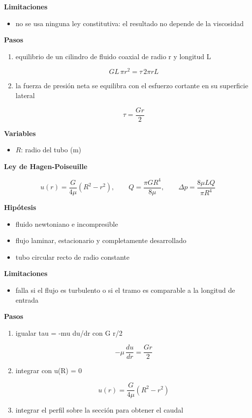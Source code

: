 \documentclass[10pt,openany]{book}
\begin{document}
\begin{tcolorbox}[title={Desarrollos del modelo}, studiumdef, breakable]
\noindent\textbf{Limitaciones}
\begin{itemize}
\item no se usa ninguna ley constitutiva: el resultado no depende de la viscosidad
\end{itemize}

\noindent\textbf{Pasos}
\begin{enumerate}
\item
equilibrio de un cilindro de fluido coaxial de radio r y longitud L

\[
G L\,\pi r^{2} = \tau\,2\pi r L
\]
\item
la fuerza de presión neta se equilibra con el esfuerzo cortante en su superficie lateral

\[
\tau = \frac{G r}{2}
\]
\end{enumerate}

\noindent\textbf{Variables}
\begin{itemize}
\item $R$: radio del tubo ($\mathrm{m}$)
\end{itemize}



\noindent\textbf{Ley de Hagen-Poiseuille}

\[
u(r) = \frac{G}{4\mu}\left(R^{2} - r^{2}\right),\qquad Q = \frac{\pi G R^{4}}{8\mu},\qquad \Delta p = \frac{8\mu L Q}{\pi R^{4}}
\]

\noindent\textbf{Hipótesis}
\begin{itemize}
\item fluido newtoniano e incompresible
\item flujo laminar, estacionario y completamente desarrollado
\item tubo circular recto de radio constante
\end{itemize}

\noindent\textbf{Limitaciones}
\begin{itemize}
\item falla si el flujo es turbulento o si el tramo es comparable a la longitud de entrada
\end{itemize}

\noindent\textbf{Pasos}
\begin{enumerate}
\item
igualar tau = -mu du/dr con G r/2

\[
-\mu\,\frac{du}{dr} = \frac{G r}{2}
\]
\item
integrar con u(R) = 0

\[
u(r) = \frac{G}{4\mu}\left(R^{2} - r^{2}\right)
\]
\item
integrar el perfil sobre la sección para obtener el caudal


\end{enumerate}
\end{tcolorbox}
\end{document}
